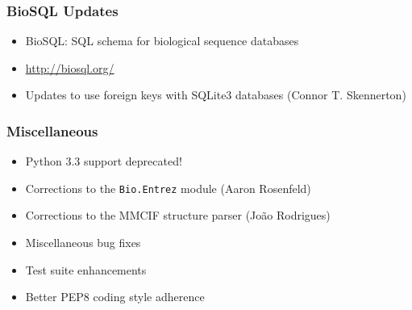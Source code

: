 \documentclass[trans]{beamer}
\begin{document}
\frame
{
  \frametitle{BioSQL Updates}
  
  \begin{itemize}
  \item BioSQL: SQL schema for biological sequence databases
  \item \url{http://biosql.org/}
  \item Updates to use foreign keys with SQLite3 databases (Connor T. Skennerton)
  \end{itemize}
}

\frame
{
  \frametitle{Miscellaneous}

  \begin{itemize}
  \item Python 3.3 support deprecated!
  \item Corrections to the \texttt{Bio.Entrez} module (Aaron Rosenfeld)
  \item Corrections to the MMCIF structure parser (João Rodrigues)
  \item Miscellaneous bug fixes
  \item Test suite enhancements
  \item Better PEP8 coding style adherence
  \end{itemize}
}
\end{document}
